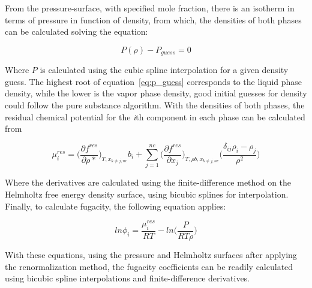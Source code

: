 \documentclass[preprint,12pt,3p]{elsarticle}
\providecommand{\DIFaddbegin}{} %
\providecommand{\DIFaddend}{} %
\providecommand{\DIFdelbegin}{} %
\providecommand{\DIFdelend}{} %
\begin{document}
\begin{appendices}
	From the pressure-surface, with specified mole fraction, there is an isotherm in terms of pressure in function of density, from which, the densities of both phases can be calculated solving the equation:

\begin{equation} \label{eq:p_guess}
	P(\rho) - P_{guess} = 0
\end{equation}	

	Where $P$ is calculated using the cubic spline interpolation for a given density guess. The highest root of equation~\ref{eq:p_guess} corresponds to the liquid phase density, while the lower is the vapor phase density, good initial guesses for density could follow the pure substance algorithm. With the densities of both phases, the residual chemical potential for the \textit{i}th component in each phase can be calculated from

\begin{equation} \label{eq:chem_pot_i}
	\mu_{i}^{res} = \DIFdelbegin %
\DIFdelend \DIFaddbegin \Bigg(\DIFaddend \frac{\partial f^{res}}{\partial \rho{*}}\DIFdelbegin %
\DIFdelend \DIFaddbegin \Bigg)\DIFaddend _{T,x_{k\neq j,nc}}b_{i}+\sum_{j=1}^{nc} \DIFdelbegin %
\DIFdelend \DIFaddbegin \Bigg(\DIFaddend \frac{\partial f^{res}}{\partial x_{j}}\DIFdelbegin %
\DIFdelend \DIFaddbegin \Bigg)\DIFaddend _{T,\rho b,x_{k\neq j,nc}} \DIFdelbegin %
\DIFdelend \DIFaddbegin \Bigg(\DIFaddend \frac{\delta_{ij} \rho_{i}-\rho_{j}}{\rho^{2}}\DIFdelbegin %
\DIFdelend \DIFaddbegin \Bigg)
\DIFaddend \end{equation} 

	Where the derivatives are calculated using the finite-difference method on the Helmholtz free energy density surface, using bicubic splines for interpolation. Finally, to calculate fugacity, the following equation applies:

\begin{equation} \label{eq:fugacity}
	ln\phi_{i} = \frac{\mu_{i}^{res}}{RT} - ln\DIFdelbegin %
\DIFdelend \DIFaddbegin \Bigg(\DIFaddend \frac{P}{RT\rho}\DIFdelbegin %
\DIFdelend \DIFaddbegin \Bigg)
\DIFaddend \end{equation}

	With these equations, using the pressure and Helmholtz surfaces after applying the renormalization method, the fugacity coefficients can be readily calculated using bicubic spline interpolations and finite-difference derivatives.	


\end{appendices}
\end{document}
